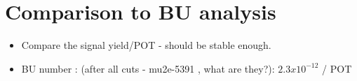 \section{Comparison to BU analysis}


{\red 
\begin{itemize}
\item 
  Compare the signal yield/POT  - should be stable enough.
\item
  BU number : (after all cuts - mu2e-5391 , what are they?): $2.3 x 10^{-12}$ / POT
\end{itemize}
}


